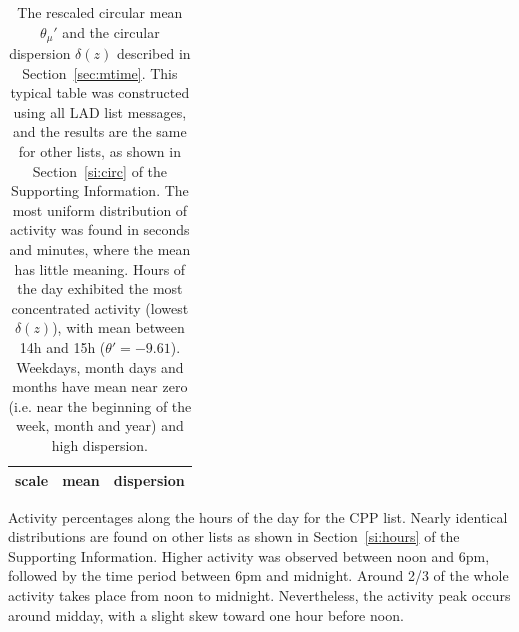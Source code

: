 \documentclass[%
	aip,
	jmp,%
	amsmath,amssymb,
	reprint,%
]{revtex4-1}
\begin{document}
\begin{table}
	\caption{The rescaled circular mean $\theta_\mu'$ and the circular dispersion $\delta(z)$ described in Section~\ref{sec:mtime}.
		This typical table was constructed using all LAD list messages, and the results are the same for other lists, as shown in Section~\ref{si:circ} of the Supporting Information.
	The most uniform distribution of activity was found in seconds and minutes, where the mean has little meaning.
	Hours of the day exhibited the most concentrated activity (lowest $\delta(z)$), with mean between 14h and 15h ($\theta'=-9.61$).
	Weekdays, month days and months have mean near zero (i.e. near the beginning of the week, month and year) and high dispersion.}
	\begin{center}
		\begin{tabular}{ |l|| c|c| }
			\hline
			{\bf scale} & {\bf mean} \boldsymbol{$\theta_\mu'$} & {\bf dispersion} \boldsymbol{$\delta(z)$ }  \\ \hline\hline
			
		\end{tabular}
	\end{center}
	\label{tab:circ}
\end{table}

\begin{table}
	\caption{Activity percentages along the hours of the day for the CPP list. Nearly identical distributions are found on other lists as shown in Section~\ref{si:hours} of the Supporting Information. Higher activity was observed between noon and 6pm, followed by the time period between 6pm and midnight. Around 2/3 of the whole activity takes place from noon to midnight. Nevertheless, the activity peak occurs around midday, with a slight skew toward one hour before noon.}
	\footnotesize
	
	\label{tab:hin}
\end{table}
\end{document}
